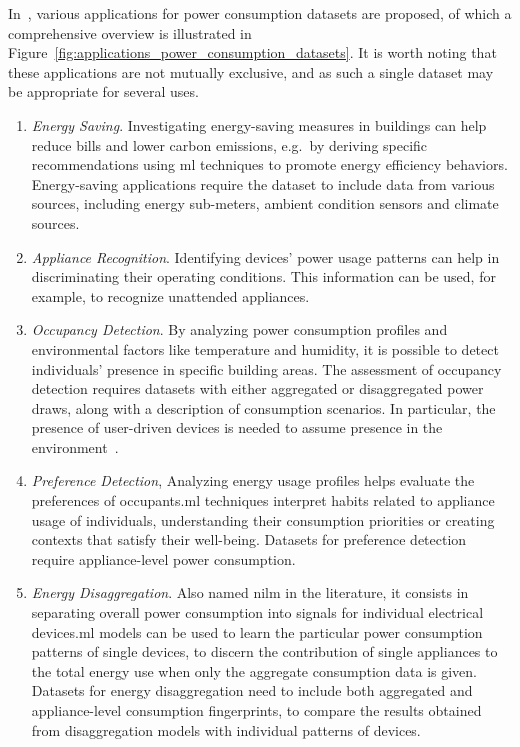 In~\parencite{himeurBuildingPowerConsumption2020}, various applications for power consumption datasets are proposed, of which a comprehensive overview is illustrated in Figure~\ref{fig:applications_power_consumption_datasets}. It is worth noting that these applications are not mutually exclusive, and as such a single dataset may be appropriate for several uses. 
\begin{enumerate}[label={\textit{A\arabic*.}}, leftmargin=3.5em]
    \item \textit{Energy Saving}. Investigating energy-saving measures in buildings can help reduce bills and lower carbon emissions, e.g.\ by deriving specific recommendations using \acrfull{ml} techniques to promote energy efficiency behaviors. Energy-saving applications require the dataset to include data from various sources, including energy sub-meters, ambient condition sensors and climate sources.

    \item \textit{Appliance Recognition}. Identifying devices' power usage patterns can help in discriminating their operating conditions. This information can be used, for example, to recognize unattended appliances.

    \item \textit{Occupancy Detection}. By analyzing power consumption profiles and environmental factors like temperature and humidity, it is possible to detect individuals' presence in specific building areas. The assessment of occupancy detection requires datasets with either aggregated or disaggregated power draws, along with a description of consumption scenarios. In particular, the presence of user-driven devices is needed to assume presence in the environment~\parencite{monacchiGREENDEnergyConsumption2014}.

    \item \textit{Preference Detection}, Analyzing energy usage profiles helps evaluate the preferences of occupants.\@ \acrshort{ml} techniques interpret habits related to appliance usage of individuals, understanding their consumption priorities or creating contexts that satisfy their well-being. Datasets for preference detection require appliance-level power consumption.

    \item \textit{Energy Disaggregation}. Also named \acrfull{nilm} in the literature, it consists in separating overall power consumption into signals for individual electrical devices.\@ \acrshort{ml} models can be used to learn the particular power consumption patterns of single devices, to discern the contribution of single appliances to the total energy use when only the aggregate consumption data is given. Datasets for energy disaggregation need to include both aggregated and appliance-level consumption fingerprints, to compare the results obtained from disaggregation models with individual patterns of devices.


\end{enumerate}
